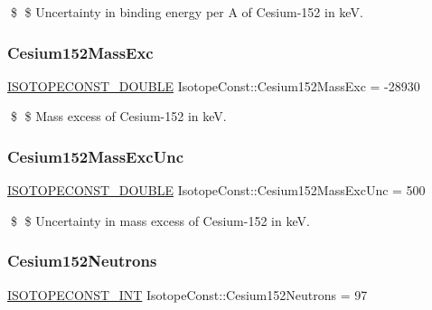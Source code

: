 \$ \$ Uncertainty in binding energy per A of Cesium-\/152 in keV. \mbox{\label{group___isotope_const-_cesium-_cs152_ga64317f38a389ba6ff06166988f14feae}} 
\subsubsection{\texorpdfstring{Cesium152\+Mass\+Exc}{Cesium152MassExc}}
{\footnotesize\ttfamily \mbox{\hyperlink{group___isotope_const-_macros_ga8f45a7272ce02c0b4c65c44636ed719a}{I\+S\+O\+T\+O\+P\+E\+C\+O\+N\+S\+T\+\_\+\+D\+O\+U\+B\+LE}} Isotope\+Const\+::\+Cesium152\+Mass\+Exc = -\/28930}

\$ \$ Mass excess of Cesium-\/152 in keV. \mbox{\label{group___isotope_const-_cesium-_cs152_ga8bf59f6ba3110826f960e243ea07ea03}} 
\subsubsection{\texorpdfstring{Cesium152\+Mass\+Exc\+Unc}{Cesium152MassExcUnc}}
{\footnotesize\ttfamily \mbox{\hyperlink{group___isotope_const-_macros_ga8f45a7272ce02c0b4c65c44636ed719a}{I\+S\+O\+T\+O\+P\+E\+C\+O\+N\+S\+T\+\_\+\+D\+O\+U\+B\+LE}} Isotope\+Const\+::\+Cesium152\+Mass\+Exc\+Unc = 500}

\$ \$ Uncertainty in mass excess of Cesium-\/152 in keV. \mbox{\label{group___isotope_const-_cesium-_cs152_gadfbddb2c07f9ad4b83a420b8f0fb32bd}} 
\subsubsection{\texorpdfstring{Cesium152\+Neutrons}{Cesium152Neutrons}}
{\footnotesize\ttfamily \mbox{\hyperlink{group___isotope_const-_macros_ga5f18360b3e99483a35c32d789e62621c}{I\+S\+O\+T\+O\+P\+E\+C\+O\+N\+S\+T\+\_\+\+I\+NT}} Isotope\+Const\+::\+Cesium152\+Neutrons = 97}

